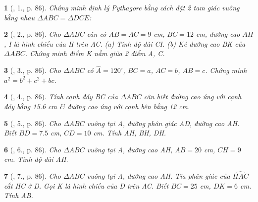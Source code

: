 \documentclass{article}
\newtheorem{baitoan}{}
\begin{document}
\begin{baitoan}[\cite{Binh_Toan_9_tap_1}, 1., p. 86]
	Chứng minh định lý Pythagore bằng cách đặt 2 tam giác vuông bằng nhau $\Delta ABC = \Delta DCE$:
	\begin{center}
	\end{center}
\end{baitoan}

\begin{baitoan}[\cite{Binh_Toan_9_tap_1}, 2., p. 86]
	Cho $\Delta ABC$ cân có $AB = AC = 9$ {\rm cm}, $BC = 12$ {\rm cm}, đường cao $AH$, I là hình chiếu của H trên AC. (a) Tính độ dài CI. (b) Kẻ đường cao BK của $\Delta ABC$. Chứng minh điểm K nằm giữa 2 điểm A, C.
\end{baitoan}

\begin{baitoan}[\cite{Binh_Toan_9_tap_1}, 3., p. 86]
	Cho $\Delta ABC$ có $\widehat{A} = 120^\circ$, $BC = a$, $AC = b$, $AB = c$. Chứng minh $a^2 = b^2 + c^2 + bc$.
\end{baitoan}

\begin{baitoan}[\cite{Binh_Toan_9_tap_1}, 4., p. 86]
	Tính cạnh đáy BC của $\Delta ABC$ cân biết đường cao ứng với cạnh đáy bằng {\rm15.6 cm} \& đường cao ứng với cạnh bên bằng {\rm12 cm}.
\end{baitoan}

\begin{baitoan}[\cite{Binh_Toan_9_tap_1}, 5., p. 86]
	Cho $\Delta ABC$ vuông tại A, đường phân giác AD, đường cao AH. Biết $BD = 7.5$ {\rm cm}, $CD = 10$ {\rm cm}. Tính AH, BH, DH.
\end{baitoan}

\begin{baitoan}[\cite{Binh_Toan_9_tap_1}, 6., p. 86]
	Cho $\Delta ABC$ vuông tại A, đường cao AH, $AB = 20$ {\rm cm}, $CH = 9$ {\rm cm}. Tính độ dài AH.
\end{baitoan}

\begin{baitoan}[\cite{Binh_Toan_9_tap_1}, 7., p. 86]
	Cho $\Delta ABC$ vuông tại A, đường cao AH. Tia phân giác của $\widehat{HAC}$ cắt HC ở D. Gọi K là hình chiếu của D trên AC. Biết $BC = 25$ {\rm cm}, $DK = 6$ {\rm cm}. Tính AB.
\end{baitoan}
\end{document}
